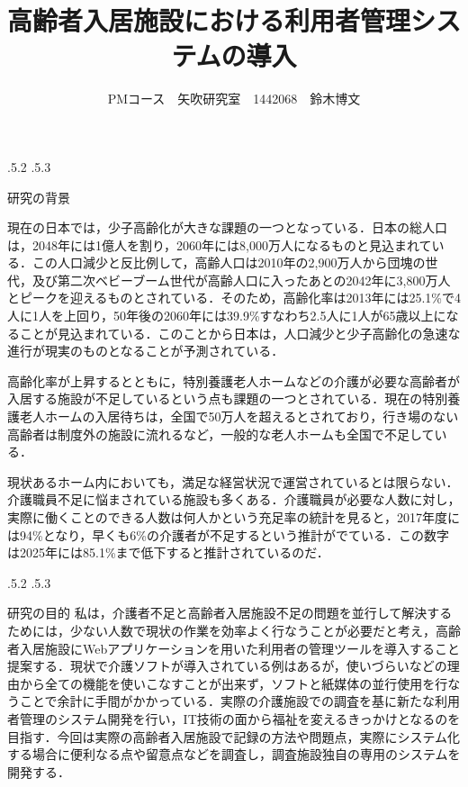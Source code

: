 \documentclass[uplatex]{jsarticle}
\title{\vspace{-14mm}高齢者入居施設における利用者管理システムの導入}
\author{PMコース　矢吹研究室　1442068　鈴木博文}
\date{}%
\makeatletter
\renewcommand{\section}{%
    \if@slide\clearpage\fi
    \@startsection{section}{1}{\z@}%
    {\Cvs \@plus.5\Cdp \@minus.2\Cdp}%
    {.5\Cvs \@plus.3\Cdp}%
    {\normalfont\raggedright}}
\makeatother
\begin{document}
\maketitle

\section{研究の背景}

現在の日本では，少子高齢化が大きな課題の一つとなっている．日本の総人口は，2048年には1億人を割り，2060年には8,000万人になるものと見込まれている．この人口減少と反比例して，高齢人口は2010年の2,900万人から団塊の世代，及び第二次ベビーブーム世代が高齢人口に入ったあとの2042年に3,800万人とピークを迎えるものとされている．そのため，高齢化率は2013年には25.1\%で4人に1人を上回り，50年後の2060年には39.9\%すなわち2.5人に1人が65歳以上になることが見込まれている．このことから日本は，人口減少と少子高齢化の急速な進行が現実のものとなることが予測されている\cite{site1}．

高齢化率が上昇するとともに，特別養護老人ホームなどの介護が必要な高齢者が入居する施設が不足しているという点も課題の一つとされている．現在の特別養護老人ホームの入居待ちは，全国で50万人を超えるとされており，行き場のない高齢者は制度外の施設に流れるなど，一般的な老人ホームも全国で不足している\cite{site2}．

現状あるホーム内においても，満足な経営状況で運営されているとは限らない．介護職員不足に悩まされている施設も多くある．介護職員が必要な人数に対し，実際に働くことのできる人数は何人かという充足率の統計を見ると，2017年度には94\%となり，早くも6\%の介護者が不足するという推計がでている．この数字は2025年には85.1\%まで低下すると推計されているのだ\cite{site3}．

\section{研究の目的}
私は，介護者不足と高齢者入居施設不足の問題を並行して解決するためには，少ない人数で現状の作業を効率よく行なうことが必要だと考え，高齢者入居施設にWebアプリケーションを用いた利用者の管理ツールを導入すること提案する．現状で介護ソフトが導入されている例はあるが，使いづらいなどの理由から全ての機能を使いこなすことが出来ず，ソフトと紙媒体の並行使用を行なうことで余計に手間がかかっている．実際の介護施設での調査を基に新たな利用者管理のシステム開発を行い，IT技術の面から福祉を変えるきっかけとなるのを目指す．今回は実際の高齢者入居施設で記録の方法や問題点，実際にシステム化する場合に便利なる点や留意点などを調査し，調査施設独自の専用のシステムを開発する．
\end{document}
